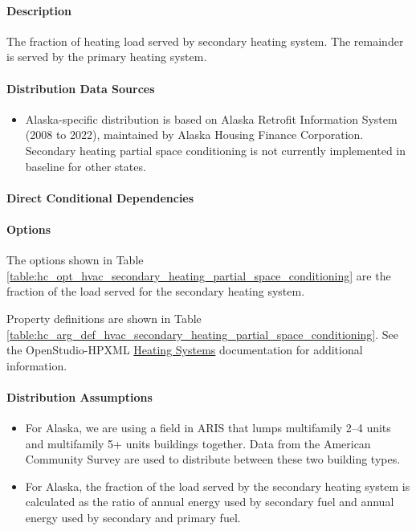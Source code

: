 \paragraph{Description}
% 
The fraction of heating load served by secondary heating system. The remainder is served by the primary heating system.

\paragraph{Distribution Data Sources}
% 
\begin{itemize}
\item Alaska-specific distribution is based on Alaska Retrofit Information System (2008 to 2022), maintained by Alaska Housing Finance Corporation. Secondary heating partial space conditioning is not currently implemented in baseline for other states.
\end{itemize}

\paragraph{Direct Conditional Dependencies}


\paragraph{Options}
The options shown in Table \ref{table:hc_opt_hvac_secondary_heating_partial_space_conditioning} are the fraction of the load served for the secondary heating system.



Property definitions are shown in Table \ref{table:hc_arg_def_hvac_secondary_heating_partial_space_conditioning}. See the OpenStudio-HPXML \href{https://openstudio-hpxml.readthedocs.io/en/v1.10.0/workflow_inputs.html#hpxml-heating-systems}{Heating Systems} documentation for additional information.



\paragraph{Distribution Assumptions}
% 
\begin{itemize}
    \item For Alaska, we are using a field in ARIS that lumps multifamily 2--4 units and multifamily 5+ units buildings together. Data from the American Community Survey are used to distribute between these two building types.
    \item For Alaska, the fraction of the load served by the secondary heating system is calculated as the ratio of annual energy used by secondary fuel and annual energy used by secondary and primary fuel.
\end{itemize}

